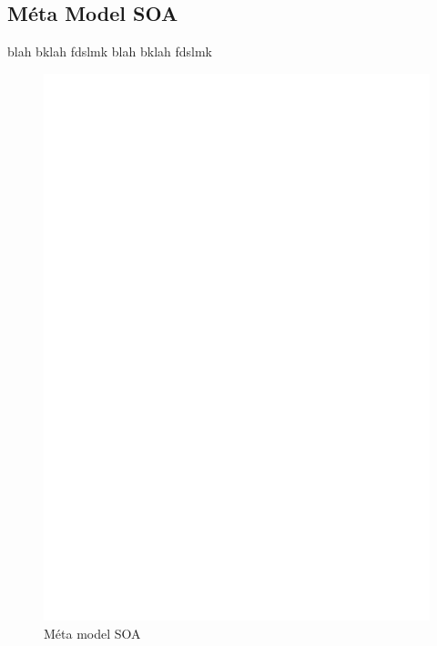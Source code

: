 \subsection{Méta Model SOA}\label{sub:soa}
blah bklah fdslmk blah bklah fdslmk 
\begin{figure}[htb]
  \centering
  \includegraphics[scale=.3]{img/SOA.eps}
  \caption{Méta model SOA}
  \label{fig:soa}
\end{figure}

